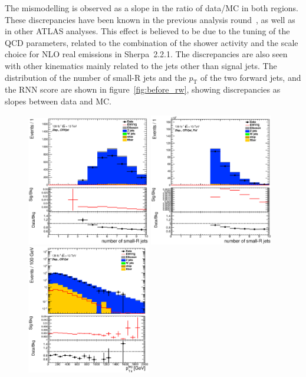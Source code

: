 The mismodelling is observed as a slope in the ratio of data/MC in both regions.
These discrepancies have been known in the previous analysis round~\cite{STDM-2017-20}, as well as in other ATLAS analyses. 
This effect is believed to be due to the tuning of the QCD parameters, related to the combination of the shower activity and the scale choice for NLO real emissions in Sherpa~2.2.1.
The discrepancies are also seen with other kinematics mainly related to the jets other than signal jets. The distribution of the number of small-R jets and the $p_\mathrm{T}$ of the two forward jets, and the RNN score are shown in figure~\ref{fig:before_rw}, showing discrepancies as slopes between data and MC.
\begin{figure}[ht]
    \centering
    \includegraphics[width=0.48\textwidth]{figures/2lep/reweighting/before_reweighting/C_0ptag1pfat0pjet_0ptv_CRVjet_NJets_Lin.eps}
    \includegraphics[width=0.48\textwidth]{figures/2lep/reweighting/before_reweighting/C_0ptag2pjet_0ptv_CRVjet_Fid_NJets_Lin.eps}
    \includegraphics[width=0.48\textwidth]{figures/2lep/reweighting/before_reweighting/C_0ptag1pfat0pjet_0ptv_CRVjet_PtTagMerJets_Log.eps}

\end{figure}

